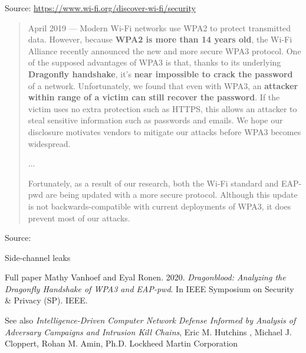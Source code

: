 \documentclass[Screen16to9,17pt]{foils}
\begin{document}
Source: \url{https://www.wi-fi.org/discover-wi-fi/security}






\begin{quote}\small
April 2019 — Modern Wi-Fi networks use WPA2 to protect transmitted data. However, because {\bf WPA2 is more than 14 years old}, the Wi-Fi Alliance recently announced the new and more secure WPA3 protocol. One of the supposed advantages of WPA3 is that, thanks to its underlying {\bf Dragonfly handshake}, it's {\bf near impossible to crack the password} of a network. Unfortunately, we found that even with WPA3, an {\bf attacker within range of a victim can still recover the password}. If the victim uses no extra protection such as HTTPS, this allows an attacker to steal sensitive information such as passwords and emails. We hope our disclosure motivates vendors to mitigate our attacks before WPA3 becomes widespread.

...

Fortunately, as a result of our research, both the Wi-Fi standard and EAP-pwd are being updated with a more secure protocol. Although this update is not backwards-compatible with current deployments of WPA3, it does prevent most of our attacks.
\end{quote}
Source: 


\begin{list2}
\item Side-channel leaks
\item Full paper Mathy Vanhoef and Eyal Ronen. 2020. \emph{Dragonblood: Analyzing the Dragonfly Handshake of WPA3 and EAP-pwd}. In IEEE Symposium on Security \& Privacy (SP). IEEE.

\end{list2}








\begin{list2}
\item See also \emph{Intelligence-Driven Computer Network Defense Informed by Analysis of Adversary Campaigns and Intrusion Kill Chains}, Eric M. Hutchins , Michael J. Cloppert, Rohan M. Amin, Ph.D. Lockheed Martin Corporation\\{\footnotesize
 }
\end{list2}
\end{document}
